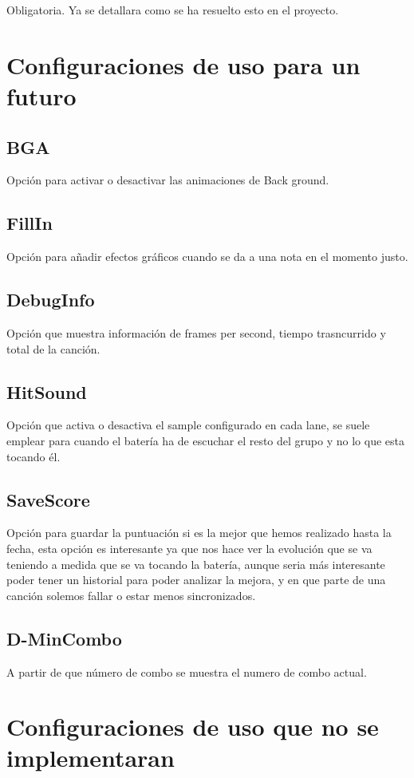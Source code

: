 \documentclass[a4paper,11pt,oneside]{book}
\begin{document}
Obligatoria. Ya se detallara como se ha resuelto esto en el proyecto.


\section{Configuraciones de uso para un futuro}

\subsection{BGA}
Opción para activar o desactivar las animaciones de Back ground.

\subsection{FillIn}
Opción para añadir efectos gráficos cuando se da a una nota en el momento justo.


\subsection{DebugInfo}
Opción que muestra información de frames per second, tiempo trasncurrido y total de la canción.


\subsection{HitSound}
Opción que activa o desactiva el sample configurado en cada lane, se suele emplear para cuando el batería ha de escuchar el resto del grupo y no lo que esta tocando él.

\subsection{SaveScore}
Opción para guardar la puntuación si es la mejor que hemos realizado hasta la fecha, esta opción es interesante ya que nos hace ver la evolución que se va teniendo a medida que se va tocando la batería, aunque seria más interesante poder tener un historial para poder analizar la mejora, y en que parte de una canción solemos fallar o estar menos sincronizados.


\subsection{D-MinCombo}
A partir de que número de combo se muestra el numero de combo actual.

\section{Configuraciones de uso que no se implementaran}
\end{document}
